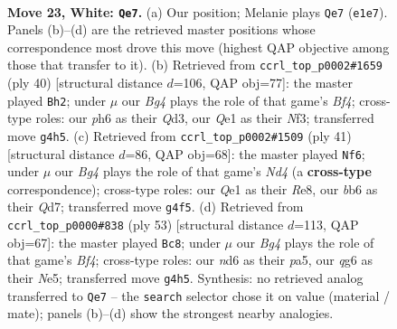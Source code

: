 \documentclass[11pt]{article}
\begin{document}
\clearpage

\begin{figure}[p]\centering
\begin{subfigure}{0.46\textwidth}\centering
\resizebox{\linewidth}{!}{%
\newchessgame
\chessboard[
  setfen={r1b3k1/pppp1pp1/1b1n2qp/3P4/6B1/2N2P1P/PPP3P1/R1B1QK2 w - - 1 23},
  showmover=false,
  pgfstyle=straightmove, color=movearrow, markmove={e1-e7}
]}
\caption{}
\end{subfigure}\hfill
\begin{subfigure}{0.46\textwidth}\centering
\resizebox{\linewidth}{!}{%
\newchessgame
\chessboard[
  setfen={r4bk1/1bqn1p1p/p2p2p1/P1pP3n/2B2B2/2NQ1N1P/1P3PP1/R5K1 w - - 5 21},
  showmover=false,
  pgfstyle=straightmove, color=movearrow, markmove={f4-h2}
]}
\caption{}
\end{subfigure}
\\[4pt]
\begin{subfigure}{0.46\textwidth}\centering
\resizebox{\linewidth}{!}{%
\newchessgame
\chessboard[
  setfen={4r1k1/3q1ppp/p1pb2b1/1p1n4/8/2PP1QP1/PPBB1P1P/R4NK1 b - - 6 21},
  showmover=false,
  pgfstyle=straightmove, color=movearrow, markmove={d5-f6}
]}
\caption{}
\end{subfigure}\hfill
\begin{subfigure}{0.46\textwidth}\centering
\resizebox{\linewidth}{!}{%
\newchessgame
\chessboard[
  setfen={3q1bk1/r4p2/p2p2p1/P1pPnb1p/2B5/1R2N2P/1P1B1PP1/2Q3K1 b - - 5 27},
  showmover=false,
  pgfstyle=straightmove, color=movearrow, markmove={f5-c8}
]}
\caption{}
\end{subfigure}
\caption{\textbf{Move 23, White: \texttt{Qe7}.} (a) Our position; Melanie plays \texttt{Qe7} (\texttt{e1e7}). Panels (b)--(d) are the retrieved master positions whose correspondence most drove this move (highest QAP objective among those that transfer to it). (b) Retrieved from \texttt{ccrl\_top\_p0002\#1659} (ply 40) [structural distance $d$=106, QAP obj=77]: the master played \texttt{Bh2}; under $\mu$ our \emph{Bg4} plays the role of that game's \emph{Bf4}; cross-type roles: our \emph{p}h6 as their \emph{Q}d3, our \emph{Q}e1 as their \emph{N}f3; transferred move \texttt{g4h5}. (c) Retrieved from \texttt{ccrl\_top\_p0002\#1509} (ply 41) [structural distance $d$=86, QAP obj=68]: the master played \texttt{Nf6}; under $\mu$ our \emph{Bg4} plays the role of that game's \emph{Nd4} (a \textbf{cross-type} correspondence); cross-type roles: our \emph{Q}e1 as their \emph{R}e8, our \emph{b}b6 as their \emph{Q}d7; transferred move \texttt{g4f5}. (d) Retrieved from \texttt{ccrl\_top\_p0000\#838} (ply 53) [structural distance $d$=113, QAP obj=67]: the master played \texttt{Bc8}; under $\mu$ our \emph{Bg4} plays the role of that game's \emph{Bf4}; cross-type roles: our \emph{n}d6 as their \emph{p}a5, our \emph{q}g6 as their \emph{N}e5; transferred move \texttt{g4h5}. Synthesis: no retrieved analog transferred to \texttt{Qe7} -- the \texttt{search} selector chose it on value (material / mate); panels (b)--(d) show the strongest nearby analogies.}
\label{fig:thought-m44}
\end{figure}
\end{document}
